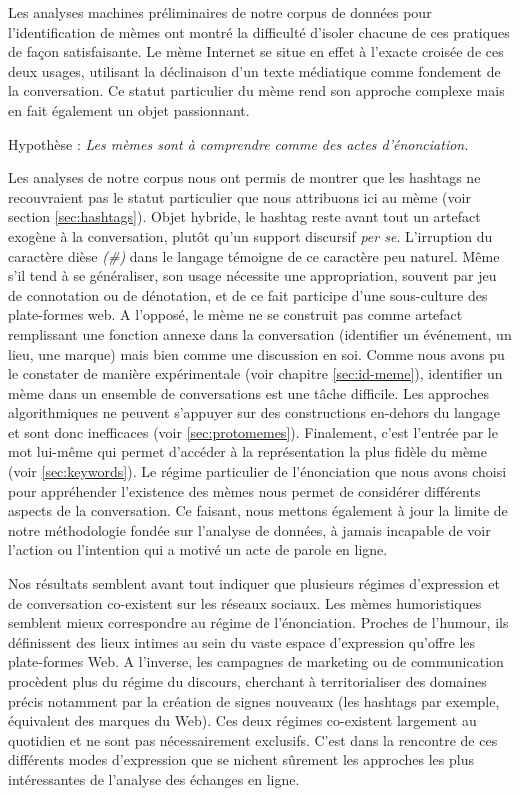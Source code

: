 Les analyses machines préliminaires de notre corpus de données pour l'identification de mèmes ont montré la difficulté d'isoler chacune de ces pratiques de façon satisfaisante. Le mème Internet se situe en effet à l'exacte croisée de ces deux usages, utilisant la déclinaison d'un texte médiatique comme fondement de la conversation. Ce statut particulier du mème rend son approche complexe mais en fait également un objet passionnant. 

Hypothèse : \textit{Les mèmes sont à comprendre comme des actes d'énonciation.}

Les analyses de notre corpus nous ont permis de montrer que les hashtags ne recouvraient pas le statut particulier que nous attribuons ici au mème (voir section \ref{sec:hashtags}). Objet hybride, le hashtag reste avant tout un artefact exogène à la conversation, plutôt qu'un support discursif \textit{per se}. L'irruption du caractère dièse \textit{(\#)} dans le langage témoigne de ce caractère peu naturel. Même s'il tend à se généraliser, son usage nécessite une appropriation, souvent par jeu de connotation ou de dénotation, et de ce fait participe d'une sous-culture des plate-formes web. A l'opposé, le mème ne se construit pas comme artefact remplissant une fonction annexe dans la conversation (identifier un événement, un lieu, une marque) mais bien comme une discussion en soi. Comme nous avons pu le constater de manière expérimentale (voir chapitre \ref{sec:id-meme}), identifier un mème dans un ensemble de conversations est une tâche difficile. Les approches algorithmiques ne peuvent s'appuyer sur des constructions en-dehors du langage et sont donc inefficaces (voir \ref{sec:protomemes}). Finalement, c'est l'entrée par le mot lui-même qui permet d'accéder à la représentation la plus fidèle du mème (voir \ref{sec:keywords}). Le régime particulier de l'énonciation que nous avons choisi pour appréhender l'existence des mèmes nous permet de considérer différents aspects de la conversation. Ce faisant, nous mettons également à jour la limite de notre méthodologie fondée sur l'analyse de données, à jamais incapable de voir l'action ou l'intention qui a motivé un acte de parole en ligne. 

Nos résultats semblent avant tout indiquer que plusieurs régimes d'expression et de conversation co-existent sur les réseaux sociaux. Les mèmes humoristiques semblent mieux correspondre au régime de l'énonciation. Proches de l'humour, ils définissent des lieux intimes au sein du vaste espace d'expression qu'offre les plate-formes Web. A l'inverse, les campagnes de marketing ou de communication procèdent plus du régime du discours, cherchant à territorialiser des domaines précis notamment par la création de signes nouveaux (les hashtags par exemple, équivalent des marques du Web). Ces deux régimes co-existent largement au quotidien et ne sont pas nécessairement exclusifs. C'est dans la rencontre de ces différents modes d'expression que se nichent sûrement les approches les plus intéressantes de l'analyse des échanges en ligne.

